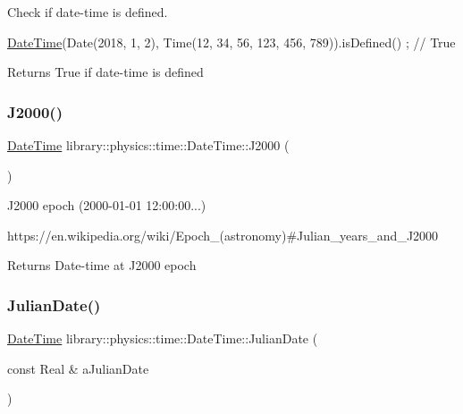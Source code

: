 Check if date-\/time is defined. 


\begin{DoxyCode}
\hyperlink{classlibrary_1_1physics_1_1time_1_1_date_time_a4ea629e533f335c928e037c4ead4646e}{DateTime}(Date(2018, 1, 2), Time(12, 34, 56, 123, 456, 789)).isDefined() ; \textcolor{comment}{// True}
\end{DoxyCode}


\begin{DoxyReturn}{Returns}
True if date-\/time is defined 
\end{DoxyReturn}
\mbox{\label{classlibrary_1_1physics_1_1time_1_1_date_time_a90b9490e08878d84d703fa9ae11cded7}} 
\subsubsection{\texorpdfstring{J2000()}{J2000()}}
{\footnotesize\ttfamily \hyperlink{classlibrary_1_1physics_1_1time_1_1_date_time}{Date\+Time} library\+::physics\+::time\+::\+Date\+Time\+::\+J2000 (\begin{DoxyParamCaption}{ }\end{DoxyParamCaption})\hspace{0.3cm}{\ttfamily [static]}}



J2000 epoch (2000-\/01-\/01 12\+:00\+:00...) 

https\+://en.wikipedia.\+org/wiki/\+Epoch\+\_\+(astronomy)\#\+Julian\+\_\+years\+\_\+and\+\_\+\+J2000

\begin{DoxyReturn}{Returns}
Date-\/time at J2000 epoch 
\end{DoxyReturn}
\mbox{\label{classlibrary_1_1physics_1_1time_1_1_date_time_a1a8238109f35a9c96d8c0038b41f1c27}} 
\subsubsection{\texorpdfstring{Julian\+Date()}{JulianDate()}}
{\footnotesize\ttfamily \hyperlink{classlibrary_1_1physics_1_1time_1_1_date_time}{Date\+Time} library\+::physics\+::time\+::\+Date\+Time\+::\+Julian\+Date (\begin{DoxyParamCaption}\item[{const Real \&}]{a\+Julian\+Date }\end{DoxyParamCaption})\hspace{0.3cm}{\ttfamily [static]}}



